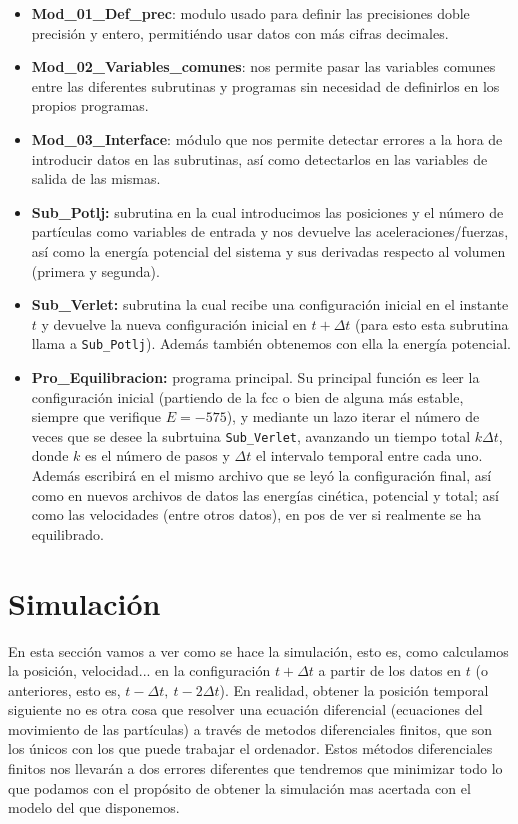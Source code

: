 \documentclass[11pt]{article} %
\begin{document}
\begin{itemize}
	\item \textbf{Mod\_01\_Def\_prec}: modulo usado para definir las precisiones doble precisión y entero, permitiéndo usar datos con más cifras decimales.
	\item \textbf{Mod\_02\_Variables\_comunes}: nos permite pasar las variables comunes entre las diferentes subrutinas y programas sin necesidad de definirlos en los propios programas.
	\item \textbf{Mod\_03\_Interface}: módulo que nos permite detectar errores a la hora de introducir datos en las subrutinas, así como detectarlos en las variables de salida de las mismas.
	\item \textbf{Sub\_Potlj:} subrutina en la cual introducimos las posiciones y el número de partículas como variables de entrada y nos devuelve las aceleraciones/fuerzas, así como la energía potencial del sistema y sus derivadas respecto al volumen (primera y segunda).
	\item \textbf{Sub\_Verlet:} subrutina la cual recibe una configuración inicial en el instante $t$ y devuelve la nueva configuración inicial en $t+\Delta t$ (para esto esta subrutina llama a \texttt{Sub\_Potlj}). Además también obtenemos con ella la energía potencial.
	\item \textbf{Pro\_Equilibracion:} programa principal. Su principal función es leer la configuración inicial (partiendo de la fcc o bien de alguna más estable, siempre que verifique $E=-575$), y mediante un lazo iterar el número de veces que se desee la subrtuina \texttt{Sub\_Verlet}, avanzando un tiempo total $k\Delta t$, donde $k$ es el número de pasos y $\Delta t$ el intervalo temporal entre cada uno. Además escribirá en el mismo archivo que se leyó la configuración final, así como en nuevos archivos de datos las energías cinética, potencial y total; así como las velocidades (entre otros datos), en pos de ver si realmente se ha equilibrado.
\end{itemize}


\section{Simulación}

En esta sección vamos a ver como se hace la simulación, esto es, como calculamos la posición, velocidad... en la configuración $t+\Delta t$ a partir de los datos en $t$ (o anteriores, esto es, $t  - \Delta t, \ t - 2 \Delta t$). En realidad, obtener la posición temporal siguiente no es otra cosa que resolver una ecuación diferencial (ecuaciones del movimiento de las partículas) a través de metodos diferenciales finitos, que son los únicos con los que puede trabajar el ordenador. Estos métodos diferenciales finitos nos llevarán a dos errores diferentes que tendremos que minimizar todo lo que podamos con el propósito de obtener la simulación mas acertada con el modelo del que disponemos. 
\end{document}
